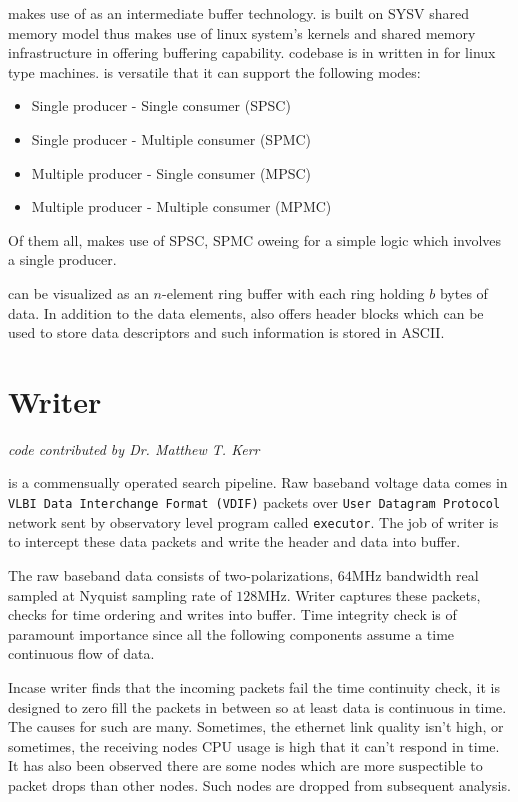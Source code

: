 \par \vf makes use of \dada as an intermediate buffer technology. \dada is built on SYSV shared memory model thus makes use of linux system's kernels and shared memory infrastructure in offering buffering capability. \dada codebase is in written in \cc for linux type machines. \dada is versatile that it can support the following modes:
\begin{itemize}
\item Single producer - Single consumer (SPSC)
\item Single producer - Multiple consumer (SPMC)
\item Multiple producer - Single consumer (MPSC)
\item Multiple producer - Multiple consumer (MPMC)
\end{itemize}
Of them all, \vf makes use of SPSC, SPMC oweing for a simple logic which involves a single producer.

\par \dada can be visualized as an $n$-element ring buffer with each ring holding $b$ bytes of data. In addition to the data elements, \dada also offers header blocks which can be used to store data descriptors and such information is stored in ASCII.

\section {Writer} 
\hfill \emph {code contributed by Dr. Matthew T. Kerr}

\par \vf is a commensually operated search pipeline. Raw baseband voltage data comes in \texttt{VLBI Data Interchange Format (VDIF)} packets over
\texttt{User Datagram Protocol} network sent by observatory level program called \texttt{executor}. The job of writer is to intercept these data packets and write the header and data into \dada buffer.

\par The raw baseband data consists of two-polarizations, $64$MHz bandwidth real sampled at Nyquist sampling rate of $128$MHz. Writer captures these packets, checks for time ordering and writes into \dada buffer. Time integrity check is of paramount importance since all the following components assume a time continuous flow of data. 

\par Incase writer finds that the incoming packets fail the time continuity check, it is designed to zero fill the packets in between so at least data is continuous in time. The causes for such are many. Sometimes, the ethernet link quality isn't high, or sometimes, the receiving nodes CPU usage is high that it can't respond in time. It has also been observed there are some nodes which are more suspectible to packet drops than other nodes. Such nodes are dropped from subsequent analysis. 

